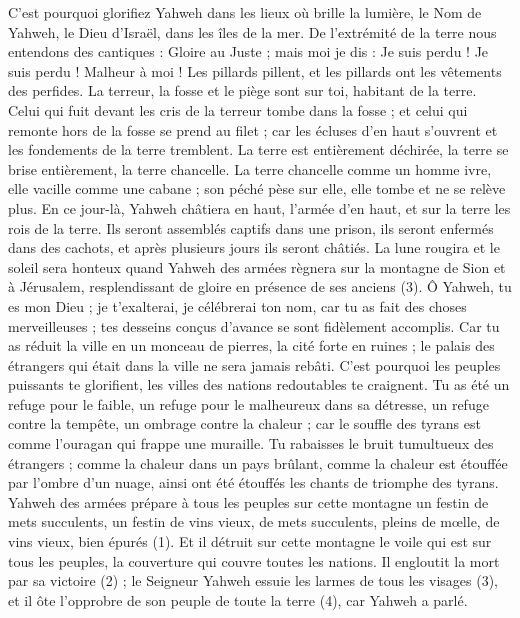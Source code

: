 \begin{multicols}{2}
{C'est pourquoi glorifiez Yahweh dans les lieux où brille la lumière, le Nom de Yahweh, le Dieu d'Israël, dans les îles de la mer.
De l’extrémité de la terre nous entendons des cantiques : Gloire au Juste ; mais moi je dis : Je suis perdu ! Je suis perdu ! Malheur à moi ! Les pillards pillent, et les pillards ont les vêtements des perfides.
La terreur, la fosse et le piège sont sur toi, habitant de la terre.
Celui qui fuit devant les cris de la terreur tombe dans la fosse ; et celui qui remonte hors de la fosse se prend au filet ; car les écluses d'en haut s’ouvrent et les fondements de la terre tremblent.
La terre est entièrement déchirée, la terre se brise entièrement, la terre chancelle.
La terre chancelle comme un homme ivre, elle vacille comme une cabane ; son péché pèse sur elle, elle tombe et ne se relève plus.
En ce jour-là, Yahweh châtiera en haut, l'armée d’en haut, et sur la terre les rois de la terre.
Ils seront assemblés captifs dans une prison, ils seront enfermés dans des cachots, et après plusieurs jours ils seront châtiés.
La lune rougira et le soleil sera honteux quand Yahweh des armées règnera sur la montagne de Sion et à Jérusalem, resplendissant de gloire en présence de ses anciens (3).
\VerseOne{}Ô Yahweh, tu es mon Dieu ; je t'exalterai, je célébrerai ton nom, car tu as fait des choses merveilleuses ; tes desseins conçus d’avance se sont fidèlement accomplis.
Car tu as réduit la ville en un monceau de pierres, la cité forte en ruines ; le palais des étrangers qui était dans la ville ne sera jamais rebâti.
C’est pourquoi les peuples puissants te glorifient, les villes des nations redoutables te craignent.
Tu as été un refuge pour le faible, un refuge pour le malheureux dans sa détresse, un refuge contre la tempête, un ombrage contre la chaleur ; car le souffle des tyrans est comme l’ouragan qui frappe une muraille.
Tu rabaisses le bruit tumultueux des étrangers ; comme la chaleur dans un pays brûlant, comme la chaleur est étouffée par l'ombre d’un nuage, ainsi ont été étouffés les chants de triomphe des tyrans.
Yahweh des armées prépare à tous les peuples sur cette montagne un festin de mets succulents, un festin de vins vieux, de mets succulents, pleins de mœlle, de vins vieux, bien épurés (1).
Et il détruit sur cette montagne le voile qui est sur tous les peuples, la couverture qui couvre toutes les nations.
Il engloutit la mort par sa victoire (2) ; le Seigneur Yahweh essuie les larmes de tous les visages (3), et il ôte l'opprobre de son peuple de toute la terre (4), car Yahweh a parlé.
}
\end{multicols}
